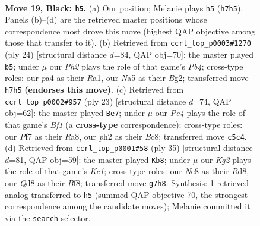 \documentclass[11pt]{article}
\begin{document}
\begin{figure}[p]
\label{fig:thought-m35}
\end{figure}

\clearpage

\begin{figure}[p]\centering
\begin{subfigure}{0.46\textwidth}\centering
\resizebox{\linewidth}{!}{%
\newchessgame
\chessboard[
  setfen={2bqn1r1/r3bpkp/p2p2p1/n1p1p3/Pp2P3/3P3N/BPPBQPPP/RN2R1K1 b - - 7 19},
  showmover=false,
  pgfstyle=straightmove, color=movearrow, markmove={h7-h5}
]}
\caption{}
\end{subfigure}\hfill
\begin{subfigure}{0.46\textwidth}\centering
\resizebox{\linewidth}{!}{%
\newchessgame
\chessboard[
  setfen={r4rk1/bppqnpp1/p2pbn1p/4p3/PPP5/BQNP1NP1/4PPBP/R4RK1 w - - 3 13},
  showmover=false,
  pgfstyle=straightmove, color=movearrow, markmove={b4-b5}
]}
\caption{}
\end{subfigure}
\\[4pt]
\begin{subfigure}{0.46\textwidth}\centering
\resizebox{\linewidth}{!}{%
\newchessgame
\chessboard[
  setfen={r1b1kb1r/2q2ppp/p1nppn2/2p5/Pp2PB2/1B1P4/1PP1NPPP/RN1QR1K1 b kq - 1 12},
  showmover=false,
  pgfstyle=straightmove, color=movearrow, markmove={f8-e7}
]}
\caption{}
\end{subfigure}\hfill
\begin{subfigure}{0.46\textwidth}\centering
\resizebox{\linewidth}{!}{%
\newchessgame
\chessboard[
  setfen={2kr1b1r/1ppbnp1q/p3p1p1/3pP2n/3P4/2NBBP1N/PPPQ3P/1K1R3R b - - 0 18},
  showmover=false,
  pgfstyle=straightmove, color=movearrow, markmove={c8-b8}
]}
\caption{}
\end{subfigure}
\caption{\textbf{Move 19, Black: \texttt{h5}.} (a) Our position; Melanie plays \texttt{h5} (\texttt{h7h5}). Panels (b)--(d) are the retrieved master positions whose correspondence most drove this move (highest QAP objective among those that transfer to it). (b) Retrieved from \texttt{ccrl\_top\_p0003\#1270} (ply 24) [structural distance $d$=84, QAP obj=70]: the master played \texttt{b5}; under $\mu$ our \emph{Ph2} plays the role of that game's \emph{Pb4}; cross-type roles: our \emph{p}a4 as their \emph{R}a1, our \emph{N}a5 as their \emph{B}g2; transferred move \texttt{h7h5} \textbf{(endorses this move)}. (c) Retrieved from \texttt{ccrl\_top\_p0002\#957} (ply 23) [structural distance $d$=74, QAP obj=62]: the master played \texttt{Be7}; under $\mu$ our \emph{Pc4} plays the role of that game's \emph{Bf1} (a \textbf{cross-type} correspondence); cross-type roles: our \emph{P}f7 as their \emph{R}a8, our \emph{p}h2 as their \emph{B}c8; transferred move \texttt{c5c4}. (d) Retrieved from \texttt{ccrl\_top\_p0001\#58} (ply 35) [structural distance $d$=81, QAP obj=59]: the master played \texttt{Kb8}; under $\mu$ our \emph{Kg2} plays the role of that game's \emph{Kc1}; cross-type roles: our \emph{N}e8 as their \emph{R}d8, our \emph{Q}d8 as their \emph{B}f8; transferred move \texttt{g7h8}. Synthesis: 1 retrieved analog transferred to \texttt{h5} (summed QAP objective 70, the strongest correspondence among the candidate moves); Melanie committed it via the \texttt{search} selector.}
\label{fig:thought-m37}
\end{figure}
\end{document}
